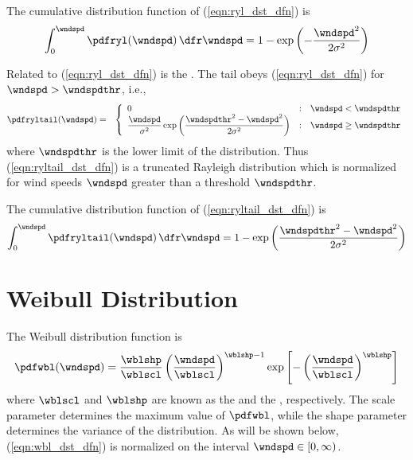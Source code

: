 \documentclass[12pt,twoside]{book}
\begin{document}
The cumulative distribution function of (\ref{eqn:ryl_dst_dfn}) is 
\begin{equation}
\int_{0}^{\wndspd} \pdfryl(\wndspd) \,\dfr\wndspd = 
1 - \exp \left( - \frac{\wndspd^{2}}{2 \sigma^{2}} \right)
\label{eqn:cdf_ryl_dfn}
\end{equation}

Related to (\ref{eqn:ryl_dst_dfn}) is the . 
The tail obeys (\ref{eqn:ryl_dst_dfn}) for $\wndspd > \wndspdthr$, i.e., 
\begin{eqnarray}
\pdfryltail(\wndspd) & = & \left\{
\begin{array}{l@{\quad:\quad}r}
0 & \wndspd < \wndspdthr \\ 
\displaystyle 
\frac{\wndspd}{\sigma^{2}} \exp \left( 
\frac{\wndspdthr^{2} - \wndspd^{2}}{2\sigma^{2}} 
\right) & \wndspd \ge \wndspdthr
\end{array} \right.
\label{eqn:ryltail_dst_dfn}
\end{eqnarray}
where $\wndspdthr$ is the lower limit of the distribution.
Thus (\ref{eqn:ryltail_dst_dfn}) is a truncated Rayleigh distribution
which is normalized for wind speeds $\wndspd$ greater than a threshold
$\wndspdthr$.

The cumulative distribution function of (\ref{eqn:ryltail_dst_dfn}) is 
\begin{equation}
\int_{0}^{\wndspd} \pdfryltail(\wndspd) \,\dfr\wndspd = 
1 - \exp \left( \frac{\wndspdthr^{2} - \wndspd^{2}}{2 \sigma^{2} } \right)
\label{eqn:cdf_ryltail_dfn}
\end{equation}

\section{Weibull Distribution}\label{sxn:wbl}
The Weibull distribution function is 
\begin{equation}
\pdfwbl(\wndspd) = \frac{\wblshp}{\wblscl} 
\left( \frac{\wndspd}{\wblscl } \right)^{\wblshp - 1} 
\exp \left[ - \left( \frac{\wndspd}{\wblscl } \right)^{\wblshp} \right]
\label{eqn:wbl_dst_dfn}
\end{equation}
where $\wblscl$ and $\wblshp$ are known as the 
and the , respectively.
The scale parameter determines the maximum value of $\pdfwbl$, while
the shape parameter determines the variance of the distribution.
As will be shown below, (\ref{eqn:wbl_dst_dfn}) is normalized on the
interval $\wndspd \in [0, \infty)$.
\end{document}
